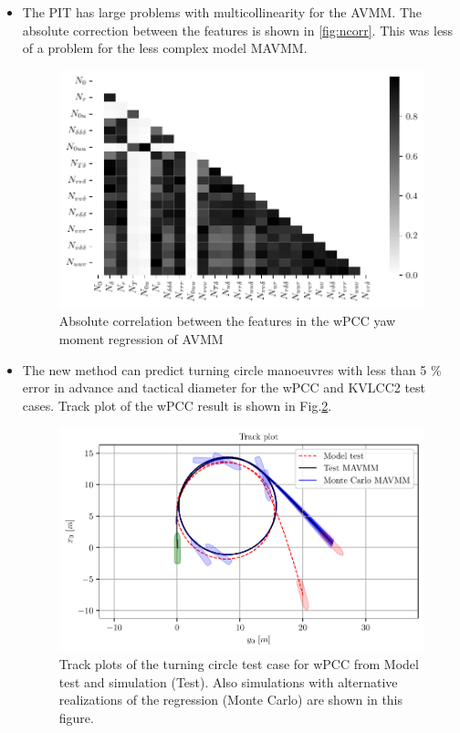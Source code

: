\begin{itemize}
    \item The PIT has large problems with multicollinearity for the AVMM. The absolute correction between the features is shown in \autoref{fig:ncorr}. This was less of a problem for the less complex model MAVMM.
    \begin{figure}[h]
        \centering
        \includegraphics{kappa/images/9.pdf}
        \caption{Absolute correlation between the features in the wPCC yaw moment regression of AVMM}
        \label{fig:ncorr}
    \end{figure}
    
    \item The new method can predict turning circle manoeuvres with less than 5 \% error in advance and tactical diameter for the wPCC and KVLCC2 test cases. Track plot of the wPCC result is shown in Fig.\ref{fig:turning_circle_wpcc}.
    \begin{figure}[h]
    \centering
    \includegraphics{kappa/images/10.pdf}
    \caption{Track plots of the turning circle test case for wPCC from Model test and simulation (Test). Also simulations with alternative realizations of the regression (Monte Carlo) are shown in this figure.}
    \label{fig:turning_circle_wpcc}
    \end{figure}
    
\end{itemize}






